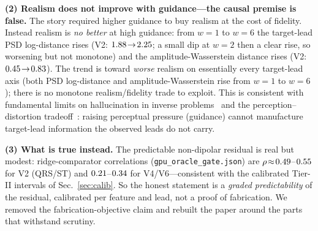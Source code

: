 \textbf{(2) Realism does not improve with guidance---the causal premise is false.} The story
required higher guidance to buy realism at the cost of fidelity. Instead realism is \emph{no
better} at high guidance: from $w{=}1$ to $w{=}6$ the target-lead PSD log-distance rises (V2:
$1.88\!\to\!2.25$; a small dip at $w{=}2$ then a clear rise, so worsening
but not monotone) and the amplitude-Wasserstein distance rises (V2:
$0.45\!\to\!0.83$). The trend is toward \emph{worse} realism on essentially
every target-lead axis (both PSD log-distance and amplitude-Wasserstein rise from $w{=}1$ to
$w{=}6$); there is no monotone realism/fidelity trade to exploit. This is consistent with
fundamental limits on hallucination in inverse problems~\cite{gottschling2026hallucinations} and
the perception--distortion tradeoff~\cite{blau2018perception}: raising perceptual pressure
(guidance) cannot manufacture target-lead information the observed leads do not carry.

\textbf{(3) What is true instead.} The predictable non-dipolar residual is real but modest:
ridge-comparator correlations (\texttt{gpu\_oracle\_gate.json}) are
$\rho\!\approx\!0.49$--$0.55$ for V2 (QRS/ST) and
$0.21$--$0.34$ for V4/V6---consistent with the calibrated Tier-II
intervals of Sec.~\ref{sec:calib}. So the honest statement is a \emph{graded predictability} of
the residual, calibrated per feature and lead, not a proof of fabrication. We removed the
fabrication-objective claim and rebuilt the paper around the parts that withstand scrutiny.

